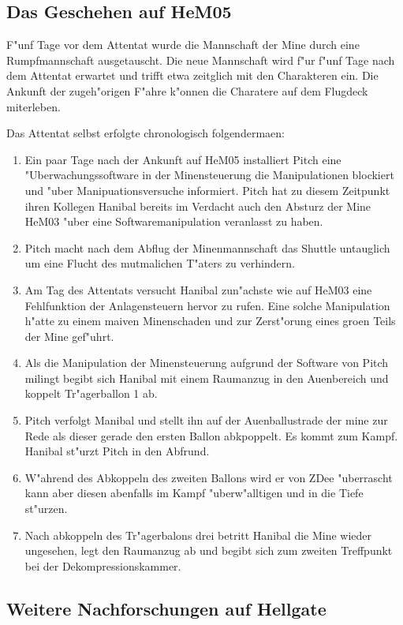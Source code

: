 \subsection{Das Geschehen auf HeM05}

F"unf Tage vor dem Attentat wurde die Mannschaft der Mine durch eine Rumpfmannschaft ausgetauscht. Die neue Mannschaft wird f"ur f"unf Tage nach dem Attentat erwartet und trifft etwa zeitglich mit den Charakteren ein. Die Ankunft der zugeh"origen F"ahre k"onnen die Charatere auf dem Flugdeck miterleben.

Das Attentat selbst erfolgte chronologisch folgenderma\3en:

\begin{enumerate}
	\item Ein paar Tage nach der Ankunft auf HeM05 installiert Pitch eine "Uberwachungssoftware in der Minensteuerung die Manipulationen blockiert und "uber Manipuationsversuche informiert. Pitch hat zu diesem Zeitpunkt ihren Kollegen Hanibal bereits im Verdacht auch den Absturz der Mine HeM03 "uber eine Softwaremanipulation veranlasst zu haben.
	\item Pitch macht nach dem Abflug der Minenmannschaft das Shuttle untauglich um eine Flucht des mutma\3lichen T"aters zu verhindern.
	\item Am Tag des Attentats versucht Hanibal zun"achste wie auf HeM03 eine Fehlfunktion der Anlagensteuern hervor zu rufen. Eine solche Manipulation h"atte zu einem ma\3iven Minenschaden und zur Zerst"orung eines gro\3en Teils der Mine gef"uhrt.
	\item Als die Manipulation der Minensteuerung aufgrund der Software von Pitch mi\3lingt begibt sich Hanibal mit einem Raumanzug in den Au\3enbereich und koppelt Tr"agerballon 1 ab.
	\item Pitch verfolgt Manibal und stellt ihn auf der Au\3enballustrade der mine zur Rede als dieser gerade den ersten Ballon abkpoppelt. Es kommt zum Kampf. Hanibal st"urzt Pitch in den Abfrund.
	\item W"ahrend des Abkoppeln des zweiten Ballons wird er von ZDee "uberrascht kann aber diesen abenfalls im Kampf "uberw"alltigen und in die Tiefe st"urzen.
	\item Nach abkoppeln des Tr"agerbalons drei betritt Hanibal die Mine wieder ungesehen, legt den Raumanzug ab und begibt sich zum zweiten Treffpunkt bei der Dekompressionskammer.
\end{enumerate}


\subsection{Weitere Nachforschungen auf Hellgate}

